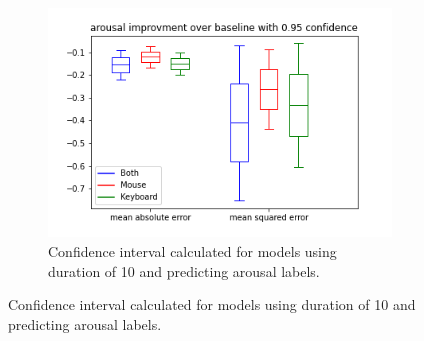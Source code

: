 \documentclass[../main.tex]{subfiles}
\begin{document}
\begin{figure}[!h]
\begin{subfigure}[b]{0.31\textwidth}
        \centering
        \includegraphics[width=\textwidth]{figures/results/interval_difference/10/10_arousal_0.95.png}
        \captionsetup{justification=centering}
        \caption{Confidence interval calculated for models using duration of 10 and predicting arousal labels.}
    \end{subfigure}



\end{figure}
\end{document}
